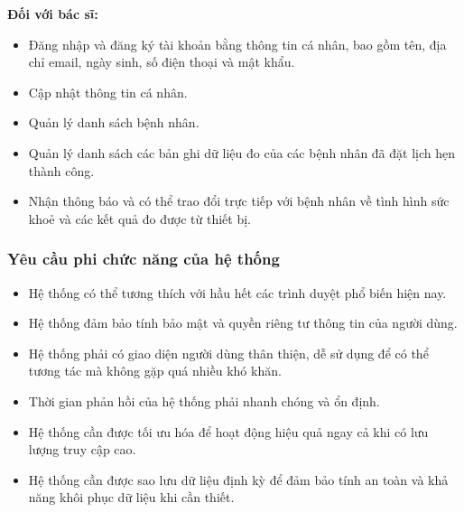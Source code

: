 \textbf{Đối với bác sĩ:}
\begin{adjustwidth}{1.5em}{}
\begin{itemize}
    \item Đăng nhập và đăng ký tài khoản bằng thông tin cá nhân, bao gồm tên, địa chỉ email, ngày sinh, số điện thoại và mật khẩu.
    \item Cập nhật thông tin cá nhân.
    \item Quản lý danh sách bệnh nhân.
    \item Quản lý danh sách các bản ghi dữ liệu đo của các bệnh nhân đã đặt lịch hẹn thành công.
    \item Nhận thông báo và có thể trao đổi trực tiếp với bệnh nhân về tình hình sức khoẻ và các kết quả đo được từ thiết bị.
\end{itemize}
\end{adjustwidth}

\subsubsection{Yêu cầu phi chức năng của hệ thống}
\begin{itemize}
    \item Hệ thống có thể tương thích với hầu hết các trình duyệt phổ biến hiện nay.
    \item Hệ thống đảm bảo tính bảo mật và quyền riêng tư thông tin của người dùng.
    \item Hệ thống phải có giao diện người dùng thân thiện, dễ sử dụng để có thể tương tác mà không gặp quá nhiều khó khăn.
    \item Thời gian phản hồi của hệ thống phải nhanh chóng và ổn định.
    \item Hệ thống cần được tối ưu hóa để hoạt động hiệu quả ngay cả khi có lưu lượng truy cập cao.
    \item Hệ thống cần được sao lưu dữ liệu định kỳ để đảm bảo tính an toàn và khả năng khôi phục dữ liệu khi cần thiết.
\end{itemize}

